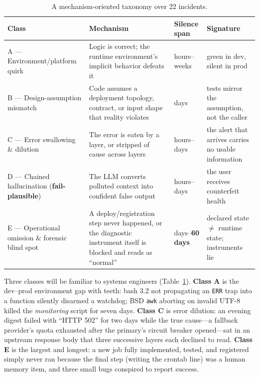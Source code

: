 \documentclass[10pt,journal]{IEEEtran}
\begin{document}
\begin{table}[t]
\centering
\caption{A mechanism-oriented taxonomy over 22 incidents.}
\label{tab:taxonomy}
\footnotesize
\begin{tabular}{@{}p{2.6cm}p{6.6cm}p{1.7cm}p{4.4cm}@{}}
\toprule
\textbf{Class} & \textbf{Mechanism} & \textbf{Silence span} & \textbf{Signature} \\
\midrule
A --- Environment/platform quirk & Logic is correct; the runtime
environment's implicit behavior defeats it & hours--weeks & green in dev,
silent in prod \\
\addlinespace
B --- Design-assumption mismatch & Code assumes a deployment topology,
contract, or input shape that reality violates & days & tests mirror the
assumption, not the caller \\
\addlinespace
C --- Error swallowing \& dilution & The error is eaten by a layer, or
stripped of cause across layers & hours--days & the alert that arrives carries
no usable information \\
\addlinespace
D --- Chained hallucination (\textbf{fail-plausible}) & The LLM converts
polluted context into confident false output & hours--days & the user receives
counterfeit health \\
\addlinespace
E --- Operational omission \& forensic blind spot & A deploy/registration step
never happened, or the diagnostic instrument itself is blocked and reads as
``normal'' & days--\textbf{60 days} & declared state $\neq$ runtime state;
instruments lie \\
\bottomrule
\end{tabular}
\end{table}

Three classes will be familiar to systems engineers (Table~\ref{tab:taxonomy}).
\textbf{Class A} is the dev--prod environment gap with teeth: bash 3.2 not
propagating an \texttt{ERR} trap into a function silently disarmed a watchdog;
BSD \texttt{awk} aborting on invalid UTF-8 killed the \emph{monitoring} script
for seven days. \textbf{Class C} is error dilution: an evening digest failed
with ``HTTP 502'' for two days while the true cause---a fallback provider's
quota exhausted after the primary's circuit breaker opened---sat in an upstream
response body that three successive layers each declined to read.
\textbf{Class E} is the largest and longest: a new job fully implemented,
tested, and registered simply never ran because the final step (writing the
crontab line) was a human memory item, and three small bugs conspired to
report success.
\end{document}
